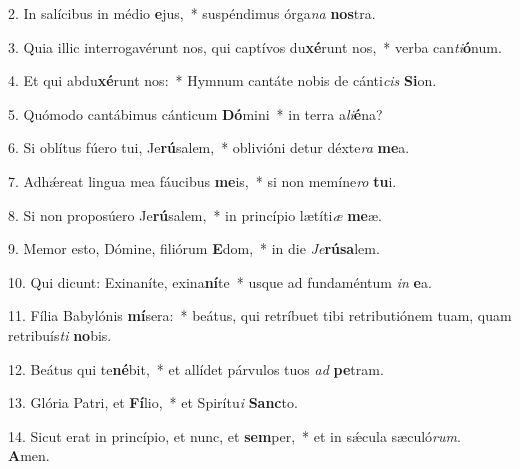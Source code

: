 2. In salícibus in médio \textbf{e}jus,~*  suspéndimus órga\textit{na} \textbf{nos}tra.\

3. Quia illic interrogavérunt nos, qui captívos du\textbf{xé}runt nos,~*  verba can\textit{ti}\textbf{ó}num.\

4. Et qui abdu\textbf{xé}runt nos:~*  Hymnum cantáte nobis de cánti\textit{cis} \textbf{Si}on.\

5. Quómodo cantábimus cánticum \textbf{Dó}mini~*  in terra a\textit{li}\textbf{é}na?\

6. Si oblítus fúero tui, Je\textbf{rú}salem,~*  oblivióni detur déxte\textit{ra} \textbf{me}a.\

7. Adhǽreat lingua mea fáucibus \textbf{me}is,~*  si non memíne\textit{ro} \textbf{tu}i.\

8. Si non proposúero Je\textbf{rú}salem,~*  in princípio lætíti\textit{æ} \textbf{me}æ.\

9. Memor esto, Dómine, filiórum \textbf{E}dom,~*  in die \textit{Je}\textbf{rú}\textbf{sa}lem.\

10. Qui dicunt: Exinaníte, exina\textbf{ní}te~*  usque ad fundaméntum \textit{in} \textbf{e}a.\

11. Fília Babylónis \textbf{mí}sera:~*  beátus, qui retríbuet tibi retributiónem tuam, quam retribuís\textit{ti} \textbf{no}bis.\

12. Beátus qui te\textbf{né}bit,~*  et allídet párvulos tuos \textit{ad} \textbf{pe}tram.\

13. Glória Patri, et \textbf{Fí}lio,~*  et Spirítu\textit{i} \textbf{Sanc}to.\

14. Sicut erat in princípio, et nunc, et \textbf{sem}per,~*  et in sǽcula sæculó\textit{rum}. \textbf{A}men.\

